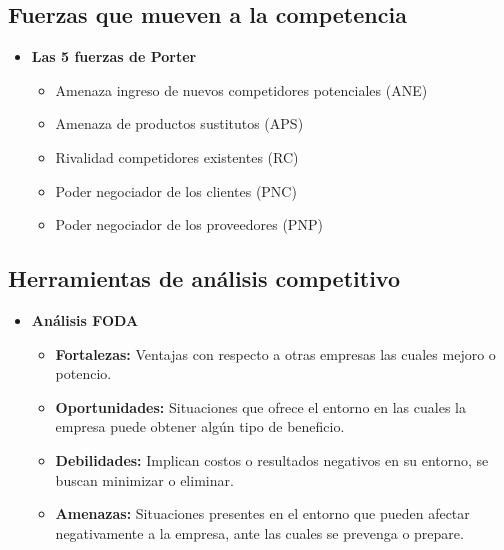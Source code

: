 \documentclass{templateNote}
\begin{document}
\begin{itemize}
    \subsection{Fuerzas que mueven a la competencia}
    \begin{itemize}
        \item \textbf{Las 5 fuerzas de Porter}
        \begin{itemize}
            \item Amenaza ingreso de nuevos competidores potenciales (ANE)
            \item Amenaza de productos sustitutos (APS)
            \item Rivalidad competidores existentes (RC)
            \item Poder negociador de los clientes (PNC)
            \item Poder negociador de los proveedores (PNP)
        \end{itemize}
    \end{itemize}

    \subsection{Herramientas de análisis competitivo}
        \begin{itemize}
            \item \textbf{Análisis FODA}
            \begin{itemize}
                \item \textbf{Fortalezas:} Ventajas con respecto a otras empresas las cuales mejoro o potencio.
                \item \textbf{Oportunidades:} Situaciones que ofrece el entorno en las cuales la empresa puede obtener algún tipo de beneficio.
                \item \textbf{Debilidades:} Implican costos o resultados negativos en su entorno, se buscan minimizar o eliminar.
                \item \textbf{Amenazas:} Situaciones presentes en el entorno que pueden afectar negativamente a la empresa, ante las cuales se prevenga o prepare.
            \end{itemize}
        \end{itemize}
    

\end{itemize}
\end{document}
